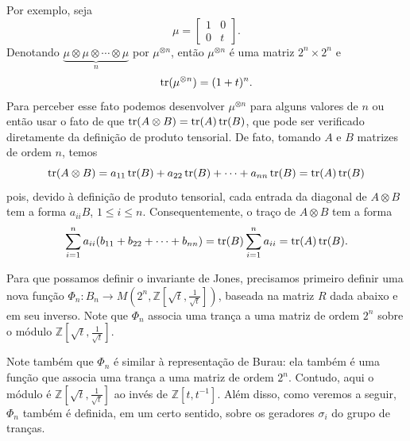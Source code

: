 	\begin{example}
    	Por exemplo, seja
    	\begin{equation}
    	\label{parte 1 invariante Jones}
        	\mu = \begin{bmatrix}
        	1 & 0 \\
        	0 & t
        	\end{bmatrix}.
    	\end{equation}
    	Denotando $\underbrace{\mu\otimes\mu\otimes\cdots\otimes\mu}_{n}$ por $\mu^{\otimes n}$, 
    	então $\mu^{\otimes n}$ é uma matriz $2^n\times 2^n$ e 
    	\begin{equation}
    	\label{mi tensor n vezes}
    	    \operatorname{tr}(\mu^{\otimes n}) = (1+t)^n.
    	\end{equation}
    	Para perceber esse fato podemos desenvolver $\mu^{\otimes n}$ para alguns valores 
    	de $n$ ou então usar o fato de que $\operatorname{tr}(A\otimes B) = \operatorname{tr}(A)\operatorname{tr}(B)$, que pode ser 
    	verificado diretamente da definição de produto tensorial. De fato, tomando $A$ e $B$ 
    	matrizes de ordem $n$, temos
    	\begin{equation*}
    	    \operatorname{tr}(A\otimes B) = a_{11}\operatorname{tr}(B) + a_{22}\operatorname{tr}(B) + \cdots + a_{nn}\operatorname{tr}(B) = \operatorname{tr}(A)\operatorname{tr}(B)
    	\end{equation*}
    	pois, devido à definição de produto tensorial, cada entrada da diagonal de $A\otimes B$ 
    	tem a forma $a_{ii}B$, $1\leq i\leq n$. Consequentemente, o traço de $A\otimes B$ tem a forma
    	\begin{equation*}
    	    \sum_{i=1}^{n}a_{ii}(b_{11} + b_{22} + \cdots + b_{nn}) = \operatorname{tr}(B)\sum_{i=1}^{n}a_{ii} = \operatorname{tr}(A)\operatorname{tr}(B).
    	\end{equation*}
	\end{example}
	Para que possamos definir o invariante de Jones, precisamos primeiro definir 
	uma nova função $\Phi_n: B_n\to M(2^n, \mathbb{Z}[\sqrt{t}, \frac{1}{\sqrt{t}}])$, 
	baseada na matriz $R$ dada abaixo e em seu inverso. Note que $\Phi_n$ associa uma trança a uma 
	matriz de ordem $2^n$ sobre o módulo $\mathbb{Z}[\sqrt{t}, \frac{1}{\sqrt{t}}]$.
	
	\par\vspace{0.3cm} Note também que $\Phi_n$ é similar à representação de Burau: 
	ela também é uma função que associa uma trança a uma matriz de ordem $2^n$. 
	Contudo, aqui o módulo é $\mathbb{Z}[\sqrt{t}, \frac{1}{\sqrt{t}}]$ ao invés 
	de $\mathbb{Z}[t, t^{-1}]$. Além disso, como veremos a seguir, $\Phi_n$ também 
	é definida, em um certo sentido, sobre os geradores $\sigma_i$ do grupo de tranças.
	
